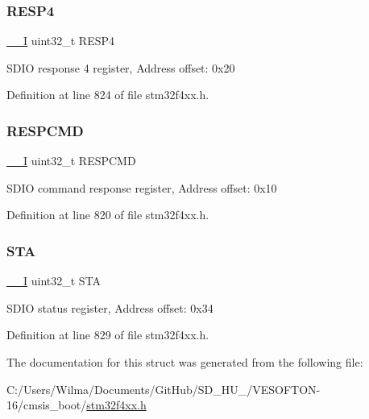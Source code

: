 \subsubsection{\texorpdfstring{R\+E\+S\+P4}{RESP4}}
{\footnotesize\ttfamily \hyperlink{group___c_m_s_i_s__core__definitions_gaf63697ed9952cc71e1225efe205f6cd3}{\+\_\+\+\_\+I} uint32\+\_\+t R\+E\+S\+P4}

S\+D\+IO response 4 register, Address offset\+: 0x20 

Definition at line 824 of file stm32f4xx.\+h.

\mbox{\label{struct_s_d_i_o___type_def_aad371db807e2db4a2edf05b3f2f4b6cd}} 
\subsubsection{\texorpdfstring{R\+E\+S\+P\+C\+MD}{RESPCMD}}
{\footnotesize\ttfamily \hyperlink{group___c_m_s_i_s__core__definitions_gaf63697ed9952cc71e1225efe205f6cd3}{\+\_\+\+\_\+I} uint32\+\_\+t R\+E\+S\+P\+C\+MD}

S\+D\+IO command response register, Address offset\+: 0x10 

Definition at line 820 of file stm32f4xx.\+h.

\mbox{\label{struct_s_d_i_o___type_def_a7520cdf6f3df68c2f147bdd87fb8a96f}} 
\subsubsection{\texorpdfstring{S\+TA}{STA}}
{\footnotesize\ttfamily \hyperlink{group___c_m_s_i_s__core__definitions_gaf63697ed9952cc71e1225efe205f6cd3}{\+\_\+\+\_\+I} uint32\+\_\+t S\+TA}

S\+D\+IO status register, Address offset\+: 0x34 

Definition at line 829 of file stm32f4xx.\+h.



The documentation for this struct was generated from the following file\+:\begin{DoxyCompactItemize}
\item 
C\+:/\+Users/\+Wilma/\+Documents/\+Git\+Hub/\+S\+D\+\_\+\+H\+U\+\_/\+V\+E\+S\+O\+F\+T\+O\+N-\/16/cmsis\+\_\+boot/\hyperlink{stm32f4xx_8h}{stm32f4xx.\+h}\end{DoxyCompactItemize}
